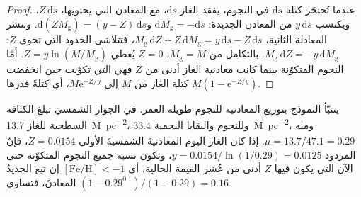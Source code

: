 \begin{proof}
عندما تُحتجَز كتلة $\mathrm{d}s$ في النجوم، يفقد الغاز
$\mathrm{d}s$، مع المعادن التي يحتويها، $Z\,\mathrm{d}s$،
ويكتسب $y\,\mathrm{d}s$ من المعادن الجديدة:
$\mathrm{d}M_\mathrm{g} = -\mathrm{d}s$
و$\mathrm{d}(Z M_\mathrm{g}) = (y - Z)\,\mathrm{d}s$. وبنشر
المعادلة الثانية، $M_\mathrm{g}\,\mathrm{d}Z + Z\,\mathrm{d}M_\mathrm{g} =
y\,\mathrm{d}s - Z\,\mathrm{d}s$، فتتلاشى الحدود التي تحوي $Z$:
$M_\mathrm{g}\,\mathrm{d}Z = -y\,\mathrm{d}M_\mathrm{g}$. بالتكامل
من $M_\mathrm{g} = M$، $Z = 0$ يُعطي $Z = y\ln(M/M_\mathrm{g})$. أمّا
النجوم المتكوّنة بينما كانت معادنية الغاز أدنى من $Z$ فهي التي تكوّنت
حين انخفضت كتلة الغاز من $M$ إلى $M\mathrm{e}^{-Z/y}$، أي كتلةً
قدرها $M(1 - \mathrm{e}^{-Z/y})$.
\end{proof}

يتنبّأ النموذج بتوزيع المعادنية للنجوم طويلة العمر.
في الجوار الشمسي تبلغ الكثافة السطحية للغاز
\qty{13.7}{M_\odot.pc^{-2}}، وللنجوم والبقايا النجمية
\qty{33.4}{M_\odot.pc^{-2}}، ومنه $\mu = 13.7/47.1 = 0.29$. إذا كان الغاز
اليوم المعادنيةَ الشمسيةَ الأولى $Z = 0.0154$، فإنّ المردود
$y = 0.0154/\ln(1/0.29) = 0.0125$، وتكون نسبة جميع النجوم
المتكوّنة حتى الآن التي يكون فيها $Z$ أدنى من عُشر القيمة الحالية،
أي $[\mathrm{Fe/H}] < -1$ إن تبع الحديدُ المعادنَ، فتساوي
$(1 - 0.29^{0.1})/(1 - 0.29) = 0.16$.

